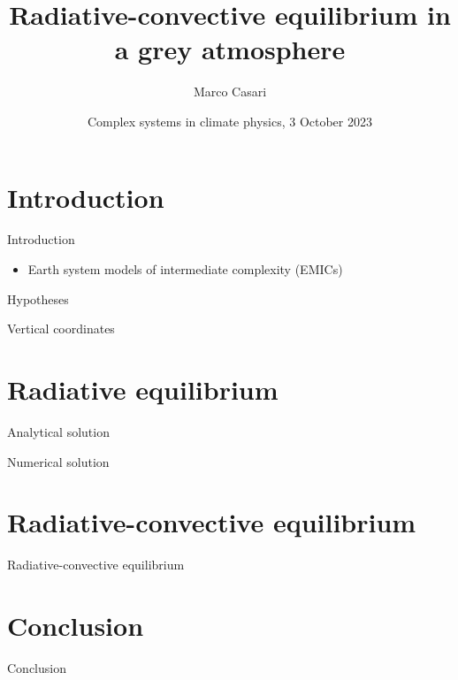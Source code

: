 \documentclass[aspectratio=43]{beamer}
\title{Radiative-convective equilibrium in a grey atmosphere}
\author{Marco Casari}
\date[03/10/2023]{Complex systems in climate physics, 3 October 2023}
\institute[UniTo]{University of Turin}
\begin{document}
\begin{frame}
  \titlepage
\end{frame}

\section{Introduction}
\begin{frame}{Introduction}
  \begin{itemize}
    \item<1-> Earth system models of intermediate complexity (EMICs)
  \end{itemize}
\end{frame}

\begin{frame}{Hypotheses}
\end{frame}

\begin{frame}{Vertical coordinates}
\end{frame}



\section{Radiative equilibrium}
\begin{frame}{Analytical solution}
\end{frame}

\begin{frame}{Numerical solution}
\end{frame}



\section{Radiative-convective equilibrium}
\begin{frame}{Radiative-convective equilibrium}
\end{frame}



\section{Conclusion}
\begin{frame}{Conclusion}
\end{frame}
\end{document}
